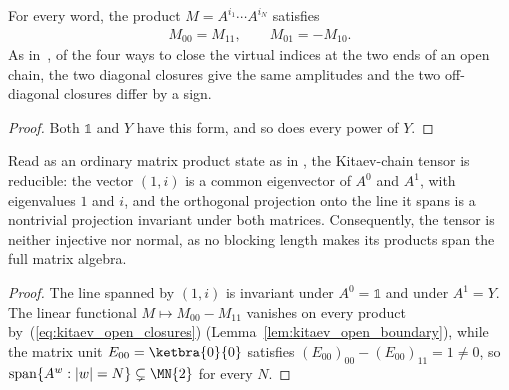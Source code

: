 \begin{lemma}\label{lem:kitaev_open_boundary}
    \leanok
    For every word, the product $M=A^{i_1}\cdots A^{i_N}$ satisfies
    \begin{align}
        M_{00}=M_{11}, \qquad M_{01}=-M_{10}.
        \label{eq:kitaev_open_closures}
    \end{align}
    As in~\cite{Bultinck2017FermionicMPS}, of the four ways to close the
    virtual indices at the two ends of an open chain, the two diagonal
    closures give the same amplitudes and the two off-diagonal closures differ
    by a sign.
\end{lemma}

\begin{proof}
    \leanok
    Both $\mathbb 1$ and $Y$ have this form, and so does every power of $Y$.
\end{proof}

\begin{lemma}%
    \label{thm:kitaev_not_normal}
    \leanok
    Read as an ordinary matrix product state as in
    \cite[Section~III.A.4]{Cirac2021Matrix}, the Kitaev-chain tensor is
    reducible: the vector $(1,i)$ is a common eigenvector of $A^0$ and $A^1$,
    with eigenvalues $1$ and $i$, and the orthogonal projection onto the line it
    spans is a nontrivial projection invariant under both matrices.
    Consequently, the tensor is neither injective nor normal, as no blocking
    length makes its products span the full matrix algebra.
\end{lemma}

\begin{proof}
    \leanok
    The line spanned by $(1,i)$ is invariant under $A^0=\mathbb 1$ and under
    $A^1=Y$. The linear functional $M\mapsto M_{00}-M_{11}$ vanishes on every
    product by~(\ref{eq:kitaev_open_closures}) (Lemma~\ref{lem:kitaev_open_boundary}), while
    the matrix unit $E_{00}=\ketbra{0}{0}$ satisfies
    $(E_{00})_{00}-(E_{00})_{11}=1\neq0$, so
    $\operatorname{span}\{A^w : |w|=N\} \subsetneq \MN{2}$ for every $N$.
\end{proof}

